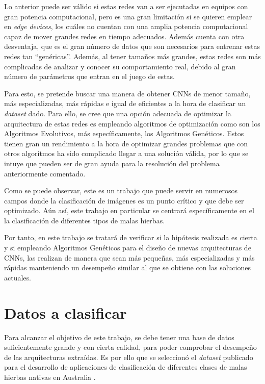 Lo anterior puede ser válido si estas redes van a ser ejecutadas en equipos con gran potencia computacional, pero es una gran limitación si se quieren emplear en \textit{edge devices}, los cuáles no cuentan con una amplia potencia computacional capaz de mover grandes redes en tiempo adecuados. Además cuenta con otra desventaja, que es el gran número de datos que son necesarios para entrenar estas redes tan ``genéricas''. Además, al tener tamaños más grandes, estas redes son más complicadas de analizar y conocer su comportamiento real, debido al gran número de parámetros que entran en el juego de estas.

Para esto, se pretende buscar una manera de obtener CNNs de menor tamaño, más especializadas, más rápidas e igual de eficientes a la hora de clasificar un \textit{dataset} dado. Para ello, se cree que una opción adecuada de optimizar la arquitectura de estas redes es empleando algoritmos de optimización como son los Algoritmos Evolutivos, más específicamente, los Algoritmos Genéticos. Estos tienen gran un rendimiento a la hora de optimizar grandes problemas que con otros algoritmos ha sido complicado llegar a una solución válida, por lo que se intuye que pueden ser de gran ayuda para la resolución del problema anteriormente comentado.

Como se puede observar, este es un trabajo que puede servir en numerosos campos donde la clasificación de imágenes es un punto crítico y que debe ser optimizado. Aún así, este trabajo en particular se centrará específicamente en el la clasificación de diferentes tipos de malas hierbas.

Por tanto, en este trabajo se tratará de verificar si la hipótesis realizada es cierta y si empleando Algoritmos Genéticos para el diseño de nuevas arquitecturas de CNNs, las realizan de manera que sean más pequeñas, más especializadas y más rápidas manteniendo un desempeño similar al que se obtiene con las soluciones actuales.

\section{Datos a clasificar}

Para alcanzar el objetivo de este trabajo, se debe tener una base de datos suficientemente grande y con cierta calidad, para poder comprobar el desempeño de las arquitecturas extraídas. Es por ello que se seleccionó el \textit{dataset} publicado para el desarrollo de aplicaciones de clasificación de diferentes clases de malas hierbas nativas en Australia \cite{Olsen2019}.

